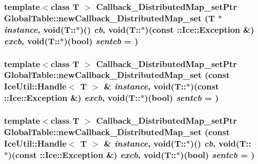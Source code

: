 \label{namespace_global_table_a9ba899f6d4548f421c542b6887a5e7c7}
\hypertarget{namespace_global_table_a224c08de8e24e76d56f269e944ddfb09}{
\subsubsection[{newCallback\_\-DistributedMap\_\-set}]{\setlength{\rightskip}{0pt plus 5cm}template$<$class T $>$ {\bf Callback\_\-DistributedMap\_\-setPtr} GlobalTable::newCallback\_\-DistributedMap\_\-set (T $\ast$ {\em instance}, \/  void(T::$\ast$)() {\em cb}, \/  void(T::$\ast$)(const ::Ice::Exception \&) {\em excb}, \/  void(T::$\ast$)(bool) {\em sentcb} = {})}}
\label{namespace_global_table_a224c08de8e24e76d56f269e944ddfb09}
\hypertarget{namespace_global_table_a0e48ba25029d2bafc7bead9a05364343}{
\subsubsection[{newCallback\_\-DistributedMap\_\-set}]{\setlength{\rightskip}{0pt plus 5cm}template$<$class T $>$ {\bf Callback\_\-DistributedMap\_\-setPtr} GlobalTable::newCallback\_\-DistributedMap\_\-set (const IceUtil::Handle$<$ T $>$ \& {\em instance}, \/  void(T::$\ast$)(const ::Ice::Exception \&) {\em excb}, \/  void(T::$\ast$)(bool) {\em sentcb} = {})}}
\label{namespace_global_table_a0e48ba25029d2bafc7bead9a05364343}
\hypertarget{namespace_global_table_a1e634d2b1b68b363dabd3db9cc89bf42}{
\subsubsection[{newCallback\_\-DistributedMap\_\-set}]{\setlength{\rightskip}{0pt plus 5cm}template$<$class T $>$ {\bf Callback\_\-DistributedMap\_\-setPtr} GlobalTable::newCallback\_\-DistributedMap\_\-set (const IceUtil::Handle$<$ T $>$ \& {\em instance}, \/  void(T::$\ast$)() {\em cb}, \/  void(T::$\ast$)(const ::Ice::Exception \&) {\em excb}, \/  void(T::$\ast$)(bool) {\em sentcb} = {})}}
